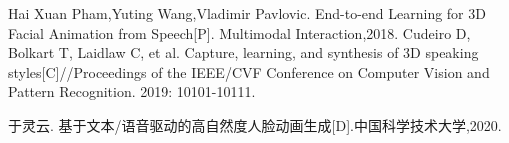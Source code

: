 \documentclass{ctexart}
\begin{document}
\begin{thebibliography}{99}
Hai Xuan Pham,Yuting Wang,Vladimir Pavlovic. End-to-end Learning for 3D Facial Animation from Speech[P]. Multimodal Interaction,2018.
Cudeiro D, Bolkart T, Laidlaw C, et al. Capture, learning, and synthesis of 3D speaking styles[C]//Proceedings of the IEEE/CVF Conference on Computer Vision and Pattern Recognition. 2019: 10101-10111.

于灵云. 基于文本/语音驱动的高自然度人脸动画生成[D].中国科学技术大学,2020.
\end{thebibliography}
\end{document}
